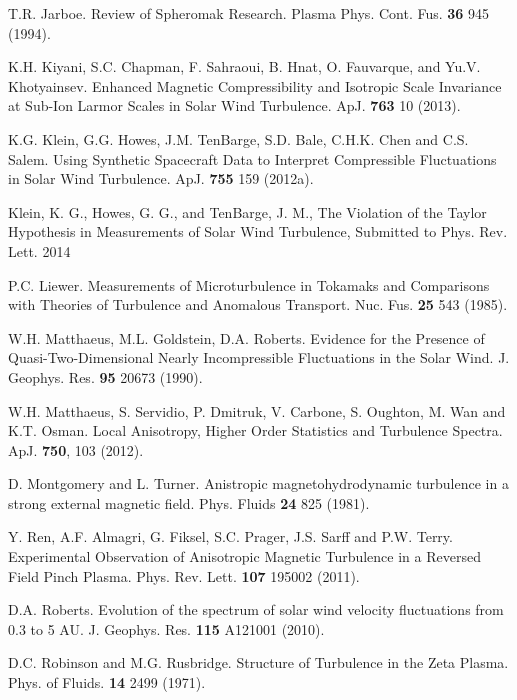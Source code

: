 \documentclass[preprint2]{aastex}
\begin{document}
\begin{thebibliography}{}
T.R. Jarboe. Review of Spheromak Research. Plasma Phys. Cont. Fus. {\bf 36} 945 (1994).

 K.H. Kiyani, S.C. Chapman, F. Sahraoui, B. Hnat, O. Fauvarque, and Yu.V. Khotyainsev. Enhanced Magnetic Compressibility and Isotropic Scale Invariance at Sub-Ion Larmor Scales in Solar Wind Turbulence. ApJ. {\bf 763} 10 (2013).

 K.G. Klein, G.G. Howes, J.M. TenBarge, S.D. Bale, C.H.K. Chen and C.S. Salem. Using Synthetic Spacecraft Data to Interpret Compressible Fluctuations in Solar Wind Turbulence. ApJ. {\bf 755} 159 (2012a).

 Klein, K. G., Howes, G. G., and TenBarge, J. M., The Violation of the Taylor Hypothesis in Measurements of Solar Wind Turbulence, Submitted to Phys. Rev. Lett. 2014

 P.C. Liewer. Measurements of Microturbulence in Tokamaks and Comparisons with Theories of Turbulence and Anomalous Transport. Nuc. Fus. {\bf 25} 543 (1985).

 W.H. Matthaeus, M.L. Goldstein, D.A. Roberts. Evidence for the Presence of Quasi-Two-Dimensional Nearly Incompressible Fluctuations in the Solar Wind. J. Geophys. Res. {\bf 95} 20673 (1990).

W.H. Matthaeus, S. Servidio, P. Dmitruk, V. Carbone, S. Oughton, M. Wan and K.T. Osman. Local Anisotropy, Higher Order Statistics and Turbulence Spectra. ApJ. {\bf 750}, 103 (2012).

 D. Montgomery and L. Turner. Anistropic magnetohydrodynamic turbulence in a strong external magnetic field. Phys. Fluids {\bf 24} 825 (1981).

 Y. Ren, A.F. Almagri, G. Fiksel, S.C. Prager, J.S. Sarff and P.W. Terry. Experimental Observation of Anisotropic Magnetic Turbulence in a Reversed Field Pinch Plasma. Phys. Rev. Lett. {\bf 107} 195002 (2011).

 D.A. Roberts. Evolution of the spectrum of solar wind velocity fluctuations from 0.3 to 5 AU. J. Geophys. Res. {\bf 115} A121001 (2010).

 D.C. Robinson and M.G. Rusbridge. Structure of Turbulence in the Zeta Plasma. Phys. of Fluids. {\bf 14} 2499 (1971).


\end{thebibliography}
\end{document}
